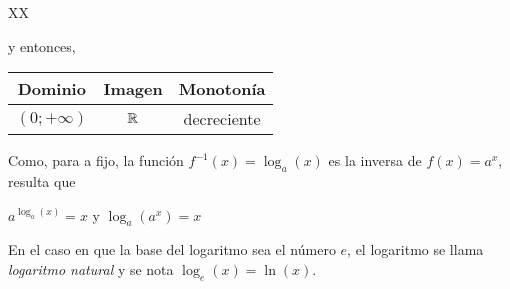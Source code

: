 \documentclass[../Teoría.root.tex]{subfiles}
\begin{document}
\begin{tabularx}{\textwidth}{XX}
\begin{center}
\begin{tikzpicture}
\begin{axis}
                    domain=-5:5,
                    samples= 100,
                    ymin=-2,
                    ymax=4
                ]
                \addplot[color=blue] {Log(0.5,\x)};
                \addlegendentry{\(\textstyle\log_\frac{1}{2}(x)\)}
            \end{axis}
        \end{tikzpicture}
    \end{center} y entonces,
    \begin{center}
        \begin{tabular}{|c|c|c|}
            \hline
            Dominio         & Imagen & Monotonía   \\\hline
            \((0;+\infty)\) & \(\mathbb{R}\) & decreciente \\
            \hline
        \end{tabular}
    \end{center}
\end{tabularx}
Como, para a fijo, la función \(f^{−1}(x) = \log_a(x)\) es la inversa de \(f(x) = a^x\), resulta que
\begin{center}
    \(a^{\log_a(x)}=x\) y \(\log_a(a^x)=x\)
\end{center}
En el caso en que la base del logaritmo sea el número \(e\), el logaritmo se llama \textit{logaritmo natural} y se nota \(\log_e(x) = \ln(x)\).
\end{document}
